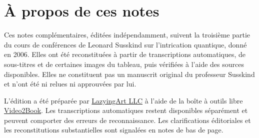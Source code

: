 \documentclass[11pt,oneside]{book}
\begin{document}
\frontmatter
\hypersetup{pageanchor=false}

\hypersetup{pageanchor=true}

\clearpage
\chapter{À propos de ces notes}
Ces notes complémentaires, éditées indépendamment, suivent la troisième partie du cours de conférences de Leonard Susskind sur l’intrication quantique, donné en 2006. Elles ont été reconstituées à partir de transcriptions automatiques, de sous-titres et de certaines images du tableau, puis vérifiées à l’aide des sources disponibles. Elles ne constituent pas un manuscrit original du professeur Susskind et n’ont été ni relues ni approuvées par lui.

L’édition a été préparée par \href{https://lazying.art}{LazyingArt LLC} à l’aide de la boîte à outils libre \href{https://github.com/lachlanchen/Video2Book}{Video2Book}. Les transcriptions automatiques restent disponibles séparément et peuvent comporter des erreurs de reconnaissance. Les clarifications éditoriales et les reconstitutions substantielles sont signalées en notes de bas de page.
\clearpage
\tableofcontents
\mainmatter








\end{document}

